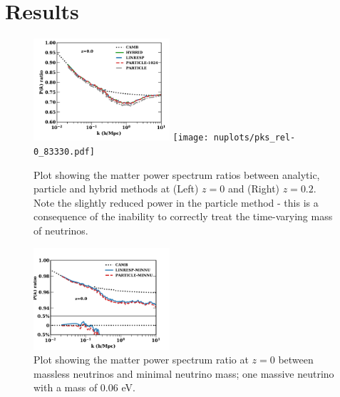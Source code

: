 \documentclass[useAMS, usenatbib]{mnras}
\begin{document}

%


\section{Results}
\label{sec:results}

\begin{figure}
\includegraphics[width=0.45\textwidth]{nuplots/pks_rel-10.pdf}
\texttt{[image: nuplots/pks\_rel-0\_83330.pdf]}
  \caption{Plot showing the matter power spectrum ratios between analytic, particle and hybrid methods at (Left) $z=0$ and (Right) $z=0.2$. Note the slightly reduced power in the particle method - this is a consequence of the inability to correctly treat the time-varying mass of neutrinos.
  }
  \label{fig:matter_power}
\end{figure}

\begin{figure}
\includegraphics[width=0.45\textwidth]{nuplots/pks_lowmass-10.pdf}
\caption{Plot showing the matter power spectrum ratio at $z=0$ between massless neutrinos and minimal neutrino mass; one massive neutrino with a mass of $0.06$ eV.
}
\label{fig:minimal_mass}
\end{figure}
\end{document}
